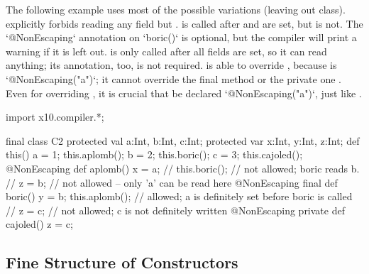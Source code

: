The following example uses most of the possible variations (leaving out
 class).   explicitly forbids reading any field but
.  is called after  and  are set, but
 is not.
The \xcd`@NonEscaping` annotation on \xcd`boric()` is optional, but the
compiler will print a warning if it is left out.
 is only called after all fields are set, so it
can read anything; its annotation, too, is not required.    is able to override , because
 is \xcd`@NonEscaping("a")`; it cannot override the final method
 or the private one .  Even for overriding
, it is crucial that  be
declared \xcd`@NonEscaping("a")`, just like .
\begin{xten}
import x10.compiler.*;

final class C2 {
  protected val a:Int, b:Int, c:Int;
  protected var x:Int, y:Int, z:Int;
  def this() {
    a = 1;
    this.aplomb();
    b = 2;
    this.boric();
    c = 3;
    this.cajoled();
  }
  @NonEscaping def aplomb() {
    x = a;
    // this.boric(); // not allowed; boric reads b.
    // z = b; // not allowed -- only 'a' can be read here
  }
  @NonEscaping final def boric() {
    y = b;
    this.aplomb(); // allowed; a is definitely set before boric is called
    // z = c; // not allowed; c is not definitely written
  }
  @NonEscaping private def cajoled() {
    z = c;
  }
}

\end{xten}
%



\subsection{Fine Structure of Constructors}
\label{SFineStructCtors}

